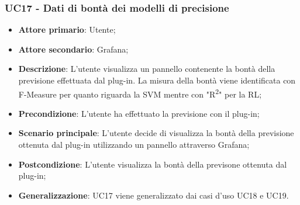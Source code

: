 \subsubsection{UC17 - Dati di bontà dei modelli di precisione}
\label{sssec:uc17}
\begin{itemize}
  \item \textbf{Attore primario}: Utente;
  \item \textbf{Attore secondario}: Grafana;
  \item \textbf{Descrizione}: L'utente visualizza un pannello contenente la bontà della previsione effettuata dal plug-in. La misura della bontà viene identificata con F-Measure per quanto riguarda la SVM mentre con "R\textsuperscript{2}" per la RL;
  \item \textbf{Precondizione}: L'utente ha effettuato la previsione con il plug-in;
  \item \textbf{Scenario principale}: L'utente decide di visualizza la bontà della previsione ottenuta dal plug-in utilizzando un pannello attraverso Grafana;
  \item \textbf{Postcondizione}: L'utente visualizza la bontà della previsone ottenuta dal plug-in;
  \item \textbf{Generalizzazione}: UC17 viene generalizzato dai casi d'uso UC18 e UC19.
\end{itemize}
